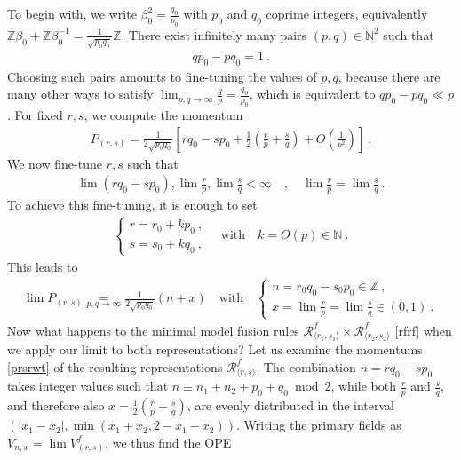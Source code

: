 \documentclass[12pt, a4paper]{article}
\theoremstyle{break}
\begin{document}
To begin with, we write $\beta_0^2 = \frac{q_0}{p_0}$ with $p_0$ and $q_0$ coprime integers, equivalently $\mathbb{Z}\beta_0+\mathbb{Z}\beta_0^{-1}=\frac{1}{\sqrt{p_0q_0}}\mathbb{Z}$. There exist infinitely many pairs $(p,q)\in \mathbb{N}^2$ such that 
\begin{align}
 qp_0-pq_0 = 1 \ .
\end{align}
Choosing such pairs amounts to fine-tuning the values of $p, q$, because there are many other ways to satisfy $\lim_{p,q\to\infty}\frac{q}{p}= \frac{q_0}{p_0}$, which is equivalent to $qp_0-pq_0 \ll p$. For fixed $r,s$, we compute the momentum
\begin{align}
 P_{(r,s)} = \frac{1}{2\sqrt{p_0q_0}}\left[rq_0-sp_0+ \frac12\left(\frac{r}{p}+\frac{s}{q}\right) + O\left(\frac{1}{p^2}\right)\right]\ . 
 \label{prsrwt}
\end{align}
We now fine-tune $r,s$ such that 
\begin{align}
 \lim(rq_0-sp_0), \lim\frac{r}{p} , \lim\frac{s}{q} <\infty \quad , \quad \lim\frac{r}{p} = \lim\frac{s}{q} \ . 
\end{align}
To achieve this fine-tuning, it is enough to set
\begin{align}
 \left\{\begin{array}{l} r = r_0 + k p_0\ , \\ s = s_0 + k q_0\ , \end{array}\right. \quad  \text{with} \quad k = O(p)\in \mathbb{N}\ .
\end{align}
This leads to 
\begin{align}
 \lim P_{(r,s)} \underset{p,q\to\infty}{=}  \frac{1}{2\sqrt{p_0q_0}}\left(n+x\right)\quad \text{with} \quad \left\{\begin{array}{l} n =r_0q_0 - s_0p_0 \in \mathbb{Z} \ , \\ x =  \lim\frac{r}{p} = \lim\frac{s}{q} \in (0, 1) \ . \end{array}\right.
\end{align}
Now what happens to the minimal model fusion rules $\mathcal{R}^f_{\langle r_1,s_1\rangle} \times \mathcal{R}^f_{\langle r_2,s_2\rangle}$ \eqref{rfrf} when we apply our limit to both representations? Let us examine the momentums \eqref{prsrwt} of the resulting representations $\mathcal{R}^f_{\langle r,s\rangle}$. The combination $n=rq_0-sp_0$ takes integer values such that $n\equiv n_1+n_2+p_0+q_0\bmod 2$, while 
both $\frac{r}{p}$ and $\frac{s}{q}$, and therefore also $x=\frac12\left(\frac{r}{p}+\frac{s}{q}\right)$, are evenly distributed in the interval $(|x_1-x_2|, \min(x_1+x_2,2-x_1-x_2))$. Writing the primary fields as $V_{n,x} = \lim V_{(r,s)}^f$, we thus find the OPE
\end{document}

